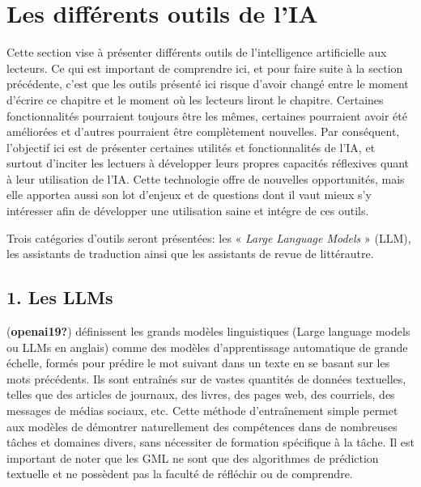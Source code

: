\documentclass[
  letterpaper,
  DIV=11,
  numbers=noendperiod]{scrreprt}
\begin{document}
\section{Les différents outils de
l'IA}\label{les-diffuxe9rents-outils-de-lia}

Cette section vise à présenter différents outils de l'intelligence
artificielle aux lecteurs. Ce qui est important de comprendre ici, et
pour faire suite à la section précédente, c'est que les outils présenté
ici risque d'avoir changé entre le moment d'écrire ce chapitre et le
moment où les lecteurs liront le chapitre. Certaines fonctionnalités
pourraient toujours être les mêmes, certaines pourraient avoir été
améliorées et d'autres pourraient être complètement nouvelles. Par
conséquent, l'objectif ici est de présenter certaines utilités et
fonctionnalités de l'IA, et surtout d'inciter les lectuers à développer
leurs propres capacités réflexives quant à leur utilisation de l'IA.
Cette technologie offre de nouvelles opportunités, mais elle apportea
aussi son lot d'enjeux et de questions dont il vaut mieux s'y intéresser
afin de développer une utilisation saine et intégre de ces outils.

Trois catégories d'outils seront présentées: les « \emph{Large Language
Models} » (LLM), les assistants de traduction ainsi que les assistants
de revue de littérautre.

\subsection{1. Les LLMs}\label{les-llms}

(\textbf{openai19?}) définissent les grands modèles linguistiques (Large
language models ou LLMs en anglais) comme des modèles d'apprentissage
automatique de grande échelle, formés pour prédire le mot suivant dans
un texte en se basant sur les mots précédents. Ils sont entraînés sur de
vastes quantités de données textuelles, telles que des articles de
journaux, des livres, des pages web, des courriels, des messages de
médias sociaux, etc. Cette méthode d'entraînement simple permet aux
modèles de démontrer naturellement des compétences dans de nombreuses
tâches et domaines divers, sans nécessiter de formation spécifique à la
tâche. Il est important de noter que les GML ne sont que des algorithmes
de prédiction textuelle et ne possèdent pas la faculté de réfléchir ou
de comprendre.
\end{document}
